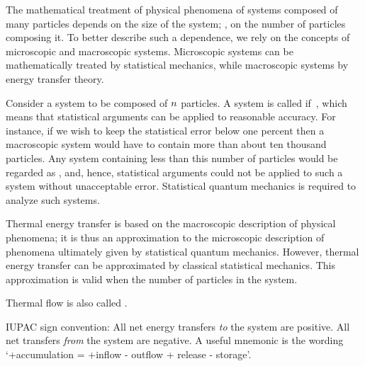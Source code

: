 \begin{technote}
The mathematical treatment of physical phenomena of systems composed of many particles depends on the size of the system; \ie, on the number of particles composing it. To better describe such a dependence, we rely on the concepts of microscopic and macroscopic systems. Microscopic systems can be mathematically treated by statistical mechanics, while macroscopic systems by energy transfer theory.

Consider a system to be composed of $n$ particles. A system is called  if
\beq
{} \,,
\eeq
which means that statistical arguments can be applied to reasonable accuracy. For instance, if we wish to keep the statistical error below one percent then a macroscopic system would have to contain more than about ten thousand particles. Any system containing less than this number of particles would be regarded as , and, hence, statistical arguments could not be applied to such a system without unacceptable error. Statistical quantum mechanics is required to analyze such systems.

Thermal energy transfer is based on the macroscopic description of physical phenomena; it is thus an approximation to the microscopic description of phenomena ultimately given by statistical quantum mechanics. However, thermal energy transfer can be approximated by classical statistical mechanics. This approximation is valid when the number of particles in the system.
\end{technote}

\begin{technote}
Thermal flow is also called .
\end{technote}

\begin{technote}
IUPAC sign convention: All net energy transfers \emph{to} the system are positive. All net transfers \emph{from} the system are negative. A useful mnemonic is the wording `+accumulation = +inflow - outflow + release - storage'.
\end{technote}

